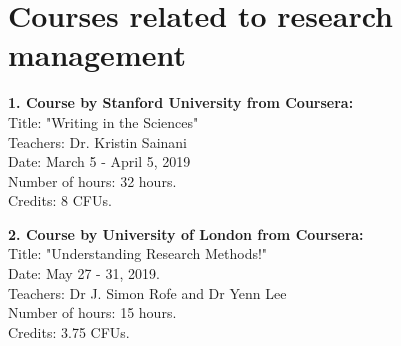 \section{Courses related to research management}

\textbf{1. Course by Stanford University from Coursera: }\\
Title: "Writing in the Sciences"\\
Teachers: Dr. Kristin Sainani \\
Date: March 5 - April 5, 2019 \\
Number of hours: 32 hours.\\ 
Credits: 8 CFUs.

\textbf{2. Course by University of London from Coursera:}\\
Title: "Understanding Research Methods!"\\
Date:  May 27 - 31, 2019.\\
Teachers:  Dr J. Simon Rofe and  Dr Yenn Lee \\
Number of hours: 15 hours.\\ 
Credits: 3.75 CFUs.